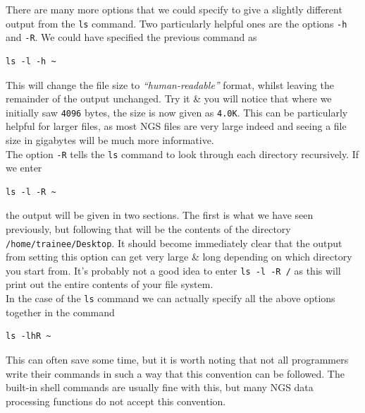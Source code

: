 \documentclass[a4paper,12pt,twoside]{memoir}
\begin{document}
\begin{advanced}
There are many more options that we could specify to give a slightly different output from the \texttt{ls} command.
Two particularly helpful ones are the options \texttt{-h} and
\texttt{-R}.
We could have specified the previous command as \\
\begin{lstlisting}
ls -l -h ~
\end{lstlisting}

This will change the file size to \textit{``human-readable''} format, whilst leaving the remainder of the output unchanged.
Try it \& you will notice that where we initially saw \texttt{4096} bytes, the size is now given as \texttt{4.0K}.
This can be particularly helpful for larger files, as most NGS files are very large indeed and seeing a file size in gigabytes will be much more informative.\\

The option \texttt{-R} tells the \texttt{ls} command to look through each directory recursively.
If we enter \\
\begin{lstlisting}
ls -l -R ~
\end{lstlisting}

the output will be given in two sections.
The first is what we have seen previously, but following that will be the contents of the directory \texttt{/home/trainee/Desktop}.
It should become immediately clear that the output from setting this option can get very large \& long depending on which directory you start from.
It's probably not a good idea to enter \texttt{ls -l -R /} as this will print out the entire contents of your file system. \\

In the case of the \texttt{ls} command we can actually specify all the above options together in the command \\
\begin{lstlisting}
ls -lhR ~
\end{lstlisting}

This can often save some time, but it is worth noting that not all programmers write their commands in such a way that this convention can be followed.
The built-in shell commands are usually fine with this, but many NGS data processing functions do not accept this convention. \\
\end{advanced}
\end{document}
